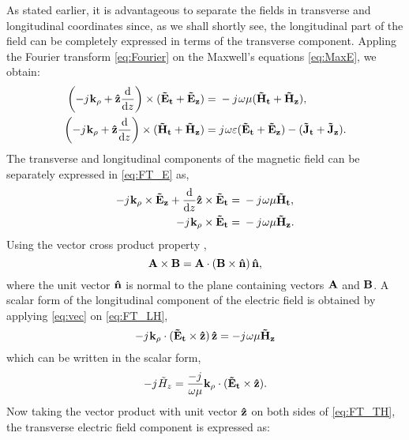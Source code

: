 \documentclass[12pt]{article}
\begin{document}
As stated earlier, it is advantageous to separate the fields in transverse and longitudinal coordinates since, as we shall shortly see, the longitudinal part of the field can be completely expressed in terms of the transverse component. Appling the Fourier transform \eqref{eq:Fourier} on the Maxwell's equations \eqref{eq:MaxE}, we obtain:
%
\begin{subequations}
  \begin{align}
    \left(-j\mkern1mu \mathbf{k_{\rho}} + \mathbf{\hat{z}} \dv{}{z} \right)\times (\mathbf{\tilde{E}_t} + \mathbf{\tilde{E}_z})  ={}& -j\mkern1mu \omega \mu (\mathbf{\tilde{H}_t} + \mathbf{\tilde{H}_z}),
    \label{eq:FT_E}\\
    \left(-j\mkern1mu \mathbf{k_{\rho}} + \mathbf{\hat{z}} \dv{}{z} \right)\times (\mathbf{\tilde{H}_t} + \mathbf{\tilde{H}_z})  ={}& j\mkern1mu \omega \varepsilon (\mathbf{\tilde{E}_t} + \mathbf{\tilde{E}_z}) -
    (\mathbf{\tilde{J}_t} + \mathbf{\tilde{J}_z}).
    \label{eq:FT_H}
  \end{align}
  \label{eq:FT_EH}%
\end{subequations}
%
The transverse and longitudinal components of the magnetic field can be separately expressed in \eqref{eq:FT_E} as,
%
\begin{subequations}
  \begin{align}
    -j\mkern1mu \mathbf{k_{\rho}} \times \mathbf{\tilde{E}_z} +
    \dv{}{z}\mathbf{\hat{z}} \times \mathbf{\tilde{E}_t} ={}&
    -j\mkern1mu \omega \mu \mathbf{\tilde{H}_t},
    \label{eq:FT_TH}\\
    -j\mkern1mu \mathbf{k_{\rho}} \times \mathbf{\tilde{E}_t} ={}&
    -j\mkern1mu \omega \mu \mathbf{\tilde{H}_z}.
    \label{eq:FT_LH}
  \end{align}
  \label{eq:FT_TLH}%
\end{subequations}
%
Using the vector cross product property \cite[p. 117]{fang2010},
%
\begin{equation}
  \mathbf{A} \times \mathbf{B} =\mathbf{A} \cdot (\mathbf{B} \times \mathbf{\hat{n}}) \, \mathbf{\hat{n}},
  \label{eq:vec}
\end{equation}
%
where the unit vector $\mathbf{\hat{n}}$ is normal to the plane containing vectors $\mathbf{A}$ and $\mathbf{B}$. A scalar form of the longitudinal component of the electric field is obtained by applying \eqref{eq:vec} on \eqref{eq:FT_LH},
%
\begin{equation}
   - j\mkern1mu \mathbf{k_{\rho}} \cdot (\mathbf{\tilde{E}_t} \times \mathbf{\hat{z}}) \, \mathbf{\hat{z}} =
   - j\mkern1mu \omega \mu \mathbf{\tilde{H}_z}
  \label{eq:FT_sLE}
\end{equation}
%
which can be written in the scalar form,
%
\begin{equation}
   - j\mkern1mu \tilde{H}_z = \frac{- j\mkern1mu}{\omega \mu}
   \mathbf{k_{\rho}} \cdot (\mathbf{\tilde{E}_t} \times \mathbf{\hat{z}}).
  \label{eq:sLH}
\end{equation}
%
Now taking the vector product with unit vector $\mathbf{\hat{z}}$ on both sides of \eqref{eq:FT_TH}, the transverse electric field component is expressed as:
\end{document}
